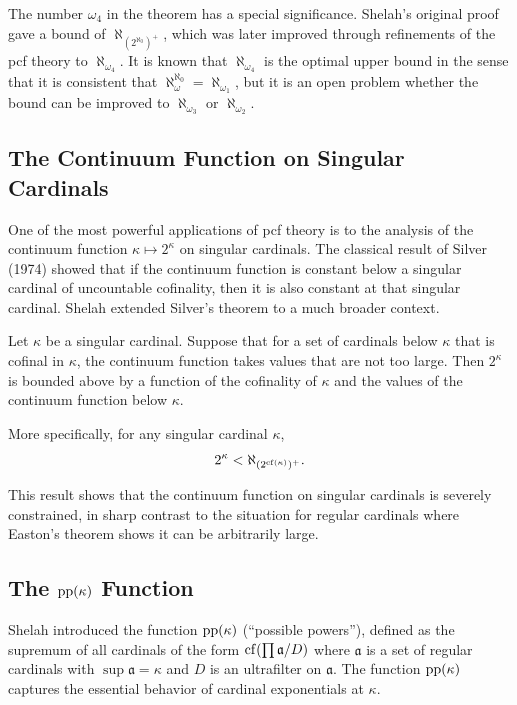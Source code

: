 The number \(\omega_4\) in the theorem has a special significance. Shelah's original proof gave a bound of \(\aleph_{(2^{\aleph_0})^{+}}\), which was later improved through refinements of the pcf theory to \(\aleph_{\omega_4}\). It is known that \(\aleph_{\omega_4}\) is the optimal upper bound in the sense that it is consistent that \(\aleph_\omega^{\aleph_0} = \aleph_{\omega_1}\), but it is an open problem whether the bound can be improved to \(\aleph_{\omega_3}\) or \(\aleph_{\omega_2}\).

\subsection{The Continuum Function on Singular Cardinals}

One of the most powerful applications of pcf theory is to the analysis of the continuum function \(\kappa \mapsto 2^\kappa\) on singular cardinals. The classical result of Silver (1974) showed that if the continuum function is constant below a singular cardinal of uncountable cofinality, then it is also constant at that singular cardinal. Shelah extended Silver's theorem to a much broader context.

\begin{theorem}
Let \(\kappa\) be a singular cardinal. Suppose that for a set of cardinals below \(\kappa\) that is cofinal in \(\kappa\), the continuum function takes values that are not too large. Then \(2^\kappa\) is bounded above by a function of the cofinality of \(\kappa\) and the values of the continuum function below \(\kappa\).

More specifically, for any singular cardinal \(\kappa\),
\[
2^\kappa < \aleph_{(2^{\operatorname{cf}(\kappa)})^{+}}.
\]
\end{theorem}

This result shows that the continuum function on singular cardinals is severely constrained, in sharp contrast to the situation for regular cardinals where Easton's theorem shows it can be arbitrarily large.

\subsection{The \texorpdfstring{\(\operatorname{pp}(\kappa)\)}{pp(kappa)} Function}

Shelah introduced the function \(\operatorname{pp}(\kappa)\) (``possible powers''), defined as the supremum of all cardinals of the form \(\operatorname{cf}(\prod \mathfrak{a} / D)\) where \(\mathfrak{a}\) is a set of regular cardinals with \(\sup \mathfrak{a} = \kappa\) and \(D\) is an ultrafilter on \(\mathfrak{a}\). The function \(\operatorname{pp}(\kappa)\) captures the essential behavior of cardinal exponentials at \(\kappa\).

